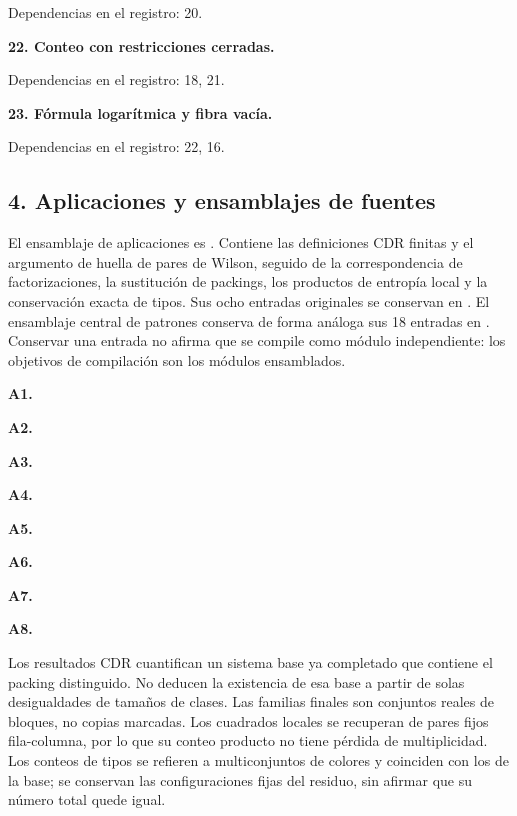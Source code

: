 \documentclass[spanish,11pt,a4paper]{article}
\begin{document}
Dependencias en el registro: 20.

\textbf{22. Conteo con restricciones cerradas.}


Dependencias en el registro: 18, 21.

\textbf{23. Fórmula logarítmica y fibra vacía.}


Dependencias en el registro: 22, 16.

\subsection{4. Aplicaciones y ensamblajes de fuentes}\label{aplicaciones-y-ensamblajes-de-fuentes}

El ensamblaje de aplicaciones es . Contiene las definiciones CDR finitas y el argumento de huella de pares de Wilson, seguido de la correspondencia de factorizaciones, la sustitución de packings, los productos de entropía local y la conservación exacta de tipos. Sus ocho entradas originales se conservan en . El ensamblaje central de patrones conserva de forma análoga sus 18 entradas en . Conservar una entrada no afirma que se compile como módulo independiente: los objetivos de compilación son los módulos ensamblados.

\textbf{A1.} 

\textbf{A2.} 

\textbf{A3.} 

\textbf{A4.} 

\textbf{A5.} 

\textbf{A6.} 

\textbf{A7.} 

\textbf{A8.} 

Los resultados CDR cuantifican un sistema base ya completado que contiene el packing distinguido. No deducen la existencia de esa base a partir de solas desigualdades de tamaños de clases. Las familias finales son conjuntos reales de bloques, no copias marcadas. Los cuadrados locales se recuperan de pares fijos fila-columna, por lo que su conteo producto no tiene pérdida de multiplicidad. Los conteos de tipos se refieren a multiconjuntos de colores y coinciden con los de la base; se conservan las configuraciones fijas del residuo, sin afirmar que su número total quede igual.
\end{document}
